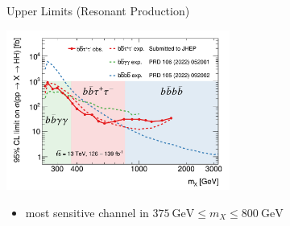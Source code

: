 \documentclass[11pt, xcolor={dvipsnames}, aspectratio=169, notes]{beamer}
\begin{document}
\begin{frame}{Upper Limits (Resonant \allbold{\HH} Production)}
  \begin{center}
    \includegraphics[width=0.55\textwidth]{discussion/atlas_comparison_resonant_marked_without_obs}
  \end{center}

  \vspace*{-0.5em}

  \begin{itemize}
    \setlength{\itemsep}{1em}

  \item \bbtautau most sensitive channel in
    $\SI{375}{\GeV} \leq m_{X} \leq \SI{800}{\GeV}$

  \end{itemize}
\end{frame}





\end{document}
